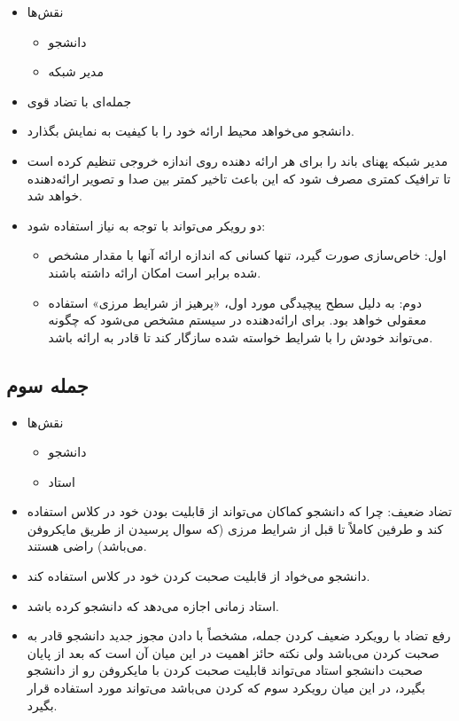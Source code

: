 \documentclass[a4paper]{article}
\begin{document}
\begin{itemize}
    \item نقش‌ها \begin{itemize}
        \item دانشجو
        \item مدیر شبکه
    \end{itemize}
    \item جمله‌ای با تضاد قوی
    \item دانشجو می‌خواهد محیط ارائه خود را با کیفیت  به نمایش
    بگذارد.
    \item مدیر شبکه پهنای باند را برای هر ارائه دهنده روی اندازه خروجی 
    تنظیم کرده است تا ترافیک کمتری مصرف شود که این باعث تاخیر کمتر بین صدا و
    تصویر ارائه‌دهنده خواهد شد.
    \item دو رویکر می‌تواند با توجه به نیاز استفاده شود: \begin{itemize}
        \item اول: خاص‌سازی صورت گیرد، تنها کسانی که اندازه ارائه آنها با مقدار
        مشخص شده برابر است امکان ارائه داشته باشند.
        \item دوم: به دلیل سطح پیچیدگی مورد اول، «پرهیز از شرایط مرزی» استفاده
        معقولی خواهد بود. برای ارائه‌دهنده در سیستم مشخص می‌شود که چگونه
        می‌تواند خودش را با شرایط خواسته شده سازگار کند تا قادر به ارائه باشد.
    \end{itemize}
\end{itemize}

\subsection*{جمله سوم}

\begin{itemize}
    \item نقش‌ها \begin{itemize}
        \item دانشجو
        \item استاد
    \end{itemize}
    \item تضاد ضعیف: چرا که دانشجو کماکان می‌تواند از قابلیت  بودن
    خود در کلاس استفاده کند و طرفین کاملاً تا قبل از شرایط مرزی (که سوال پرسیدن از طریق
    مایکروفن می‌باشد) راضی هستند.
    \item دانشجو می‌خواد از قابلیت صحبت کردن خود در کلاس استفاده کند.
    \item استاد زمانی اجازه می‌دهد که دانشجو  کرده باشد.
    \item رفع تضاد با رویکرد ضعیف کردن جمله، مشخصاً با دادن مجوز جدید دانشجو
    قادر به صحبت کردن می‌باشد ولی نکته حائز اهمیت در این میان آن است که بعد از
    پایان صحبت دانشجو استاد می‌تواند قابلیت صحبت کردن با مایکروفن رو از دانشجو
    بگیرد، در این میان رویکرد سوم که  کردن می‌باشد می‌تواند مورد
    استفاده قرار بگیرد.
\end{itemize}
\end{document}
